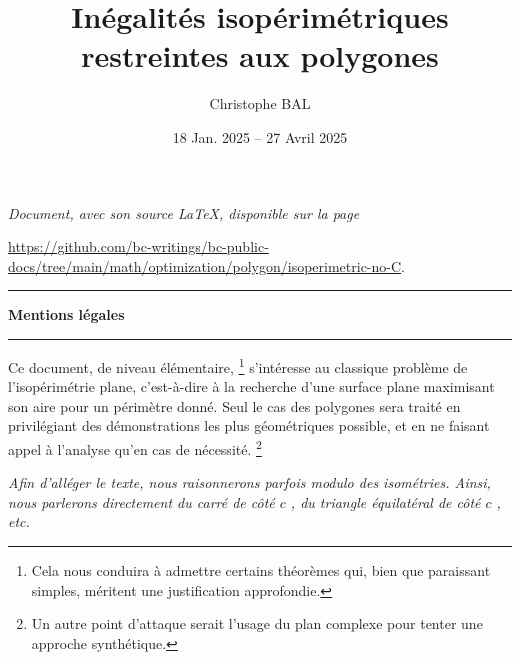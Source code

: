 \documentclass[12pt]{amsart}
\begin{document}
\title{Inégalités isopérimétriques restreintes aux polygones}
\author{Christophe BAL}
\date{18 Jan. 2025 -- 27 Avril 2025}

\maketitle

\begin{center}
	\itshape
	Document, avec son source \LaTeX, disponible sur la page

	\url{https://github.com/bc-writings/bc-public-docs/tree/main/math/optimization/polygon/isoperimetric-no-C}.
\end{center}


\bigskip


\begin{center}
	\hrule\vspace{.3em}
	{
		\fontsize{1.35em}{1em}\selectfont
		\textbf{Mentions \og légales \fg}
	}

	\vspace{0.45em}
	\doclicenseThis
	\hrule
\end{center}



\setcounter{tocdepth}{2}
\tableofcontents




\newpage

\begin{meta-abstract*}
	Ce document, de niveau élémentaire,%
	\footnote{
    	Cela nous conduira à admettre certains théorèmes qui, bien que paraissant simples, méritent une justification approfondie.
	}
	s'intéresse au classique problème de l'isopérimétrie plane, c'est-à-dire à la recherche d'une surface plane maximisant son aire pour un périmètre donné.
	Seul le cas des polygones sera traité en privilégiant des démonstrations les plus géométriques possible, et en ne faisant appel à l'analyse qu'en cas de nécessité.%
	\footnote{
    	Un autre point d'attaque serait l'usage du plan complexe pour tenter une approche synthétique.
	}
\end{meta-abstract*}


\begin{tcolorbox}
    \itshape\small
    Afin d'alléger le texte, nous raisonnerons parfois modulo des isométries. Ainsi, nous parlerons directement du \og carré de côté \( c \) \fg, du \og triangle équilatéral de côté \( c \) \fg, etc.
\end{tcolorbox}


\end{document}
